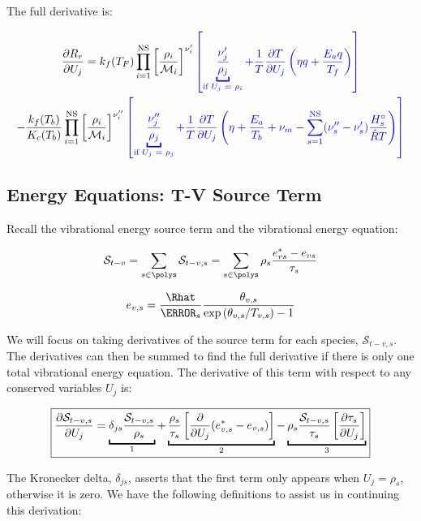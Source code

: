 \documentclass[10pt]{article}
\begin{document}
\begin{flushleft}
The full derivative is:

\begin{multline}
    \pd{R_r}{U_j} = k_f(T_F) \prod_{i=1}^\text{NS} \bb{\frac{\rho_i}{\mathcal{M}_i}}^{\nu_i'} \textcolor{blue}{\bb{ \underbracket{\frac{\nu_j'}{\rho_j}}_{\text{if $U_j$ = $\rho_i$}} + \frac{1}{T} \pd{T}{U_j} \bp{\eta q + \frac{E_a q}{T_f}} }} 
    \\ - \frac{k_f(T_b)}{K_c(T_b)} \prod_{i=1}^\text{NS} \bb{\frac{\rho_i}{\mathcal{M}_i}}^{\nu_i''} \textcolor{blue}{ \bb{\underbracket{\frac{\nu_j''}{\rho_j}}_{\text{if $U_j$ = $\rho_j$}} + \frac{1}{T} \pd{T}{U_j} \bp{\eta + \frac{E_a}{T_b} + \nu_m - \sum_{s=1}^\text{NS} (\nu_s'' - \nu_s') \frac{H_s^\circ}{\hat{R}T}} }}
\end{multline}

\subsection{Energy Equations: T-V Source Term}
\label{app:Stv-Jacobian}

Recall the vibrational energy source term and the vibrational energy equation:

\begin{equation}
    \mathcal{S}_{t-v} = \sum_{s \in \polys} \mathcal{S}_{t-v,s} = \sum_{s \in \polys} \rho_s \frac{e_{vs}^* - e_{vs}}{\tau_s}
\end{equation}

\begin{equation}
    e_{v,s} = \frac{\Rhat}{\MW_s} \frac{\theta_{v,s}}{\exp{(\theta_{v,s} / T_{v,s})} - 1}
\end{equation}

We will focus on taking derivatives of the source term for each species, $\mathcal{S}_{t-v,s}$. The derivatives can then be summed to find the full derivative if there is only one total vibrational energy equation. The derivative of this term with respect to any conserved variables $U_j$ is:

\begin{equation}
    \boxed{\pd{\mathcal{S}_{t-v,s}}{U_j} = \ub{ \delta_{js} \frac{\mathcal{S}_{t-v,s}}{\rho_s}}{1}
    + \ub{\frac{\rho_s}{\tau_s} \bb{\pd{}{U_j} (e_{v,s}^* - e_{v,s})}}{2} - \ub{\rho_s \frac{\mathcal{S}_{t-v,s}}{\tau_s} \bb{\pd{\tau_s}{U_j}}}{3}  }
\end{equation}

The Kronecker delta, $\delta_{js}$, asserts that the first term only appears when $U_j = \rho_s$, otherwise it is zero. We have the following definitions to assist us in continuing this derivation:


\end{flushleft}
\end{document}
